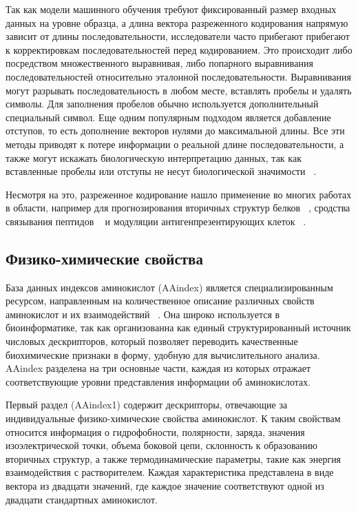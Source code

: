 \documentclass[specification,annotation,times]{itmo-student-thesis}
\begin{document}
Так как модели машинного обучения требуют фиксированный размер входных данных на уровне образца, а длина вектора разреженного кодирования напрямую зависит от длины последовательности, исследователи часто прибегают прибегают к корректировкам последовательностей перед кодированием. Это происходит либо посредством множественного выравнивая, либо попарного выравнивания последовательностей относительно эталонной последовательности. 
Выравнивания могут разрывать последовательность в любом месте, вставлять пробелы и удалять символы. Для заполнения пробелов обычно используется дополнительный специальный символ. Еще одним популярным подходом является добавление отступов, то есть дополнение векторов нулями до максимальной длины. 
Все эти методы приводят к потере информации о реальной длине последовательности, а также могут искажать биологическую интерпретацию данных, так как вставленные пробелы или отступы не несут биологической значимости ~\cite{spanig2019encodings}.

Несмотря на это, разреженное кодирование нашло применение во многих работах в области, например для прогнозирования вторичных структур белков ~\cite{hirst1992prediction}, сродства связывания пептидов ~\cite{nielsen2003reliable}  и модуляции антигенпрезентирующих клеток ~\cite{nagpal2018computer}.


\subsection{Физико-химические свойства}\label{sec:phys-chem-enc}

База данных индексов аминокислот (AAindex) является специализированным ресурсом, направленным на количественное описание различных свойств аминокислот и их взаимодействий ~\cite{kawashima2007aaindex}. Она широко используется в биоинформатике, так как организованна как единый структурированный источник числовых дескрипторов, который позволяет переводить качественные биохимические признаки в форму, удобную для вычислительного анализа. AAindex разделена на три основные части, каждая из которых отражает соответствующие уровни представления информации об аминокислотах.

Первый раздел (AAindex1) содержит дескрипторы, отвечающие за индивидуальные физико-химические свойства аминокислот. К таким свойствам относится информация о гидрофобности, полярности, заряда, значения изоэлектрической точки, объема боковой цепи, склонность к образованию вторичных структур, а также термодинамические параметры, такие как энергия взаимодействия с растворителем. Каждая характеристика представлена в виде вектора из двадцати значений, где каждое значение соответствуют одной из двадцати стандартных аминокислот.
\end{document}
